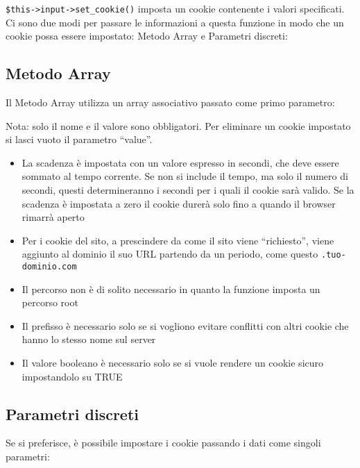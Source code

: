 
\verb|$this->input->set_cookie()| imposta un cookie contenente i valori specificati. Ci sono due modi per passare le informazioni a questa funzione in modo che un cookie possa essere impostato: Metodo Array e Parametri discreti:

\subsection*{Metodo Array}
Il Metodo Array utilizza un array associativo passato come primo parametro:


Nota: solo il nome e il valore sono obbligatori. Per eliminare un cookie impostato si lasci vuoto il parametro ``value''.

\begin{itemize}
\item La scadenza è impostata con un valore espresso in secondi, che deve essere sommato al tempo corrente. Se non si include il tempo, ma solo il numero di secondi, questi determineranno i secondi per i quali il cookie sarà valido. Se la scadenza è impostata a zero il cookie durerà solo fino a quando il browser rimarrà aperto
\item Per i cookie del sito, a prescindere da come il sito viene ``richiesto'', viene aggiunto al dominio il suo \ac{URL} partendo da un periodo, come questo \verb|.tuo-dominio.com|
\item Il percorso non è di solito necessario in quanto la funzione imposta un percorso root
\item Il prefisso è necessario solo se si vogliono evitare conflitti con altri cookie che hanno lo stesso nome sul server
\item Il valore booleano  è necessario solo se si vuole rendere un cookie sicuro impostandolo su TRUE
\end{itemize}

\subsection*{Parametri discreti}
Se si preferisce, è possibile impostare i cookie passando i dati come singoli parametri:

